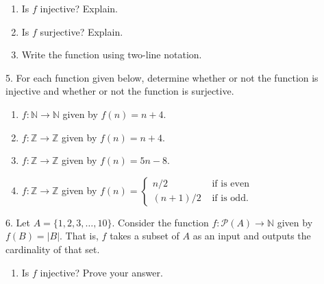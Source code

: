 \documentclass[10pt,]{book}
\theoremstyle{plain}
\theoremstyle{definition}
\theoremstyle{definition}
\theoremstyle{definition}
\numberwithin{equation}{section}
\def\N{\mathbb N}
\def\Z{\mathbb Z}
\def\pow{\mathcal P}
\newcommand{\amp}{ & }
\begin{document}
\begin{exerciselist}
\begin{figure}
{
}
\end{figure}
\leavevmode%
\begin{enumerate}[label=(\alph*)]
\item\hypertarget{li-306}{}
                Is \(f\) injective? Explain.
\item\hypertarget{li-307}{}
                Is \(f\) surjective? Explain.
\item\hypertarget{li-308}{}
                Write the function using two-line notation.
\end{enumerate}
\par\smallskip
\item[5.]\hypertarget{exercise-31}{}
            For each function given below, determine whether or not the function is injective and whether or not the function is surjective.
\leavevmode%
\begin{enumerate}[label=(\alph*)]
\item\hypertarget{li-312}{}\(f:\N \to \N\) given by \(f(n) = n+4\).\item\hypertarget{li-313}{}\(f:\Z \to \Z\) given by \(f(n) = n+4\).\item\hypertarget{li-314}{}\(f:\Z \to \Z\) given by \(f(n) = 5n - 8\).\item\hypertarget{li-315}{}\(f:\Z \to \Z\) given by \(f(n) = \begin{cases}n/2 \amp  \mbox{ if  is even} \\ (n+1)/2 \amp \mbox{ if  is odd} . \end{cases}
              \)\end{enumerate}
\par\smallskip
\item[6.]\hypertarget{exercise-32}{}
            Let \(A = \{1,2,3,\ldots,10\}\). Consider the function \(f:\pow(A) \to \N\) given by \(f(B) = |B|\). That is, \(f\) takes a subset of \(A\) as an input and outputs the cardinality of that set.
\leavevmode%
\begin{enumerate}[label=(\alph*)]
\item\hypertarget{li-320}{}
                Is \(f\) injective? Prove your answer.

\end{enumerate}
\end{exerciselist}
\end{document}
